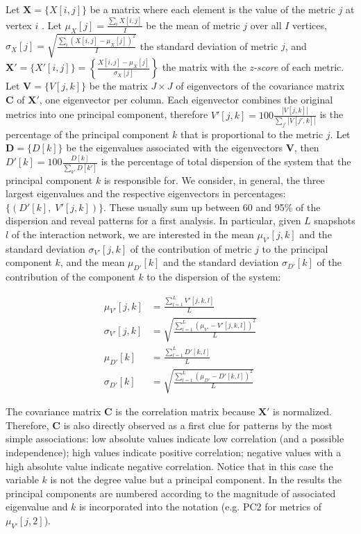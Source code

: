 \documentclass[%
aip,
jmp,%
amsmath,amssymb,
reprint,%
]{revtex4-1}
\begin{document}
Let $\mathbf{X}=\{X[i,j]\}$ be a matrix where each element is the value
of the metric $j$ at vertex $i$ .
Let
$\mu_X [j]=\frac{\sum_i X[i,j]}{I}$ be the mean of metric $j$ over all $I$ vertices, 
$\sigma_X [j]=\sqrt{\frac{\sum_i (X[i,j]-\mu_X [j])^2}{I}}$ the standard deviation of metric $j$,
and $\mathbf{X'}=\{X'[i,j]\}=\left\{\frac{X[i,j]-\mu_X[j]}{\sigma_X[j]}\right\}$ 
the matrix with the \emph{z-score} of each metric. 
Let $\mathbf{V}=\{V[j,k]\}$ be the matrix $J\times J$ of eigenvectors
of the covariance matrix $\mathbf{C}$
of $\mathbf{X'}$, one eigenvector per column.
Each eigenvector combines the original metrics into one principal component, therefore
$V'[j,k]=100\frac{|V[j,k]|}{\sum_{j'} |V[j',k]|}$
is the percentage of the principal component $k$
that is proportional to the metric $j$.
Let $\mathbf{D}=\{D[k]\}$ be the eigenvalues associated with the eigenvectors $\mathbf{V}$,
then $D'[k]=100\frac{D[k]}{\sum_{k'}D[k']}$
is the percentage of total dispersion of the system that the principal component $k$
is responsible for.
We consider, in general, the three largest eigenvalues and
the respective eigenvectors in percentages:
$\{(D'[k],\;V'[j,k])\}$.
These usually sum up between 60 and 95\% of the dispersion
and reveal patterns for a first analysis.
In particular, 
given $L$ snapshots $l$ of the interaction network,
we are interested in the mean
$\mu_{V'}[j,k]$
and the standard deviation $\sigma_{V'}[j,k]$ 
of the contribution of metric $j$ to the principal component $k$,
and the mean
$\mu_{D'}[k]$
and the standard deviation 
$\sigma_{D'}[k]$
of the contribution of the component $k$ to the dispersion
of the system:

\begin{align}\label{eq:pca}
\mu_{V'}[j,k]   &=\frac{\sum_{l=1}^L V'[j,k,l]}{L}\nonumber\\
\sigma_{V'}[j,k]&=\sqrt{\frac{\sum_{l=1}^L (\mu_{V'}-V'[j,k,l])^2}{L}}\\\nonumber
\mu_{D'}[k]&=\frac{\sum_{l=1}^L D'[k,l]}{L}\\\nonumber
\sigma_{D'}[k]&=\sqrt{\frac{\sum_{l=1}^L (\mu_{D'}-D'[k,l])^2}{L}}
\end{align}

The covariance matrix 
$\mathbf{C}$ is the correlation matrix because $\mathbf{X'}$ is normalized.
Therefore, $\mathbf{C}$ is also directly observed as a first clue for patterns
by the most simple associations:
low absolute values indicate low correlation (and a possible independence);
high values indicate positive correlation;
negative values with a high absolute value indicate negative correlation.
Notice that in this case the variable $k$ is not the degree value
but a principal component.
In the results the principal components are numbered
according to the magnitude of associated eigenvalue and $k$ is incorporated into
the notation (e.g. PC2 for metrics of $\mu_{V'}[j,2]$).
\end{document}
